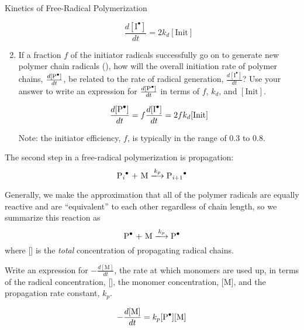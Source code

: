 \begin{activity}{Kinetics of Free-Radical Polymerization}
\begin{ctqs}
\begin{enumerate}
				\begin{solution}[1in]{}
					\begin{equation*}					
						\frac{d[\text{I}^\bullet]}{dt} = 2k_d[\text{Init}]
					\end{equation*}
				\end{solution}
		
			\item If a fraction $f$ of the initiator radicals successfully go on to generate new polymer chain radicals (), how will the overall initiation rate of polymer chains, $\frac{d[\text{\ce{P^.}}]}{dt}$, be related to the rate of radical generation, $\frac{d[\text{I}^\bullet]}{dt}$?  Use your answer to write an expression for $\frac{d[\text{\ce{P^.}}]}{dt}$ in terms of $f$, $k_d$, and $[\text{Init}]$.
		
				\begin{solution}[1.25in]{}
					\begin{equation*}		
					\frac{d[\text{\ce{P^.}}]}{dt} = f\frac{d[\text{I}^\bullet]}{dt} = 2fk_d[\text{Init}]
					\end{equation*}
					
					Note: the initiator efficiency, $f$, is typically in the range of 0.3 to 0.8.
				\end{solution}
		
		\end{enumerate}
		
	\question The second step in a free-radical polymerization is propagation:
		\begin{equation*}
			\text{\ce{P_i^.} + M} \xlongrightarrow{k_p} \text{\ce{P_{i+1}^.}}
		\end{equation*}
		
		Generally, we make the approximation that all of the polymer radicals are equally reactive and are ``equivalent'' to each other regardless of chain length, so we summarize this reaction as
		\begin{equation*}
			\text{\ce{P^.} + M} \xlongrightarrow{k_p} \text{\ce{P^.}}
		\end{equation*}
		where [] is the \emph{total} concentration of propagating radical chains.
	
		Write an expression for $-\frac{d[\text{M}]}{dt}$, the rate at which monomers are used up, in terms of the radical concentration, [], the monomer concentration, [M], and the propagation rate constant, $k_p$.
		
		\begin{solution}[1.25in]{}
			\begin{equation*}
				-\frac{d[\text{M}]}{dt} = k_p [\text{\ce{P^.}}][\text{M}]
			\end{equation*}
		\end{solution}
		

\end{ctqs}
\end{activity}
